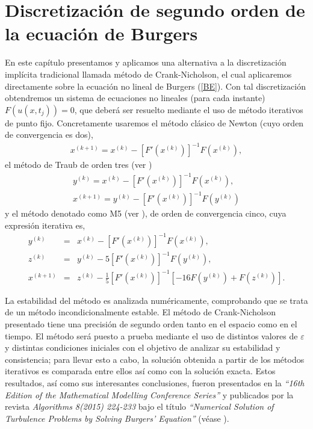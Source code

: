 
\chapter{Discretización de segundo orden de la ecuación de Burgers}\label{articuloburger}

En este capítulo presentamos y aplicamos una alternativa a la discretización implícita tradicional llamada método de Crank-Nicholson, el cual aplicaremos directamente sobre la ecuación no lineal de Burgers (\ref{BE}). Con tal discretización obtendremos un sistema de ecuaciones no lineales (para cada instante) $F(u(x,t_j))=0$, que deberá ser resuelto mediante el uso de método iterativos de punto fijo.
Concretamente usaremos el método clásico de Newton (cuyo orden de convergencia es dos),
\begin{eqnarray} \label{newton}
x^{(k+1)}=x^{(k)}-[F'(x^{(k)})]^{-1}F(x^{(k)}),
\end{eqnarray}
el método de Traub de orden tres (ver \cite{TR})
\begin{eqnarray} \label{traub}
y^{(k)}=x^{(k)}-[F'(x^{(k)})]^{-1}F(x^{(k)}), \\\nonumber
x^{(k+1)}=y^{(k)}-[F'(x^{(k)})]^{-1}F(y^{(k)})
\end{eqnarray}
y el método denotado como M5 (ver \cite{ACT}), de orden de convergencia cinco, cuya expresión iterativa es,
\begin{eqnarray} \label{m5}
y^{(k)}&=&x^{(k)}-[F'(x^{(k)})]^{-1}F(x^{(k)}), \\ \nonumber
z^{(k)}&=&y^{(k)}-5[F'(x^{(k)})]^{-1}F(y^{(k)}), \\
x^{(k+1)}&=&z^{(k)}-\frac{1}{5}
[F'(x^{(k)})]^{-1}[-16F(y^{(k)})+F(z^{(k)})].\nonumber
\end{eqnarray}

La estabilidad del método es analizada numéricamente, comprobando que se trata de un método incondicionalmente estable. El método de Crank-Nicholson presentado tiene una precisión de segundo orden tanto en el espacio como en el tiempo. El método será puesto a prueba mediante el uso de distintos valores de $\varepsilon$ y distintas condiciones iniciales con el objetivo de analizar su estabilidad y consistencia; para llevar esto a cabo, la solución obtenida a partir de los métodos iterativos es comparada entre ellos así como con la solución exacta. Estos resultados, así como sus interesantes conclusiones, fueron presentados en la \textit{``16th Edition of the	Mathematical Modelling Conference Series''} y publicados por la revista \textit{Algorithms 8(2015) 224-233} bajo el título \textit{``Numerical Solution of Turbulence Problems by Solving Burgers’ Equation''} (véase \cite{paperburgers}).

